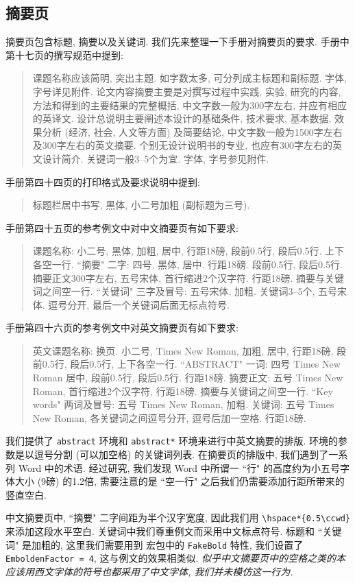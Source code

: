 \subsection{摘要页}

摘要页包含标题, 摘要以及关键词. 我们先来整理一下手册对摘要页的要求. 手册中第十七页的撰写规范中提到:
\begin{quote}
  课题名称应该简明, 突出主题. 如字数太多, 可分列成主标题和副标题. 字体, 字号详见附件.
  论文内容摘要主要是对撰写过程中实践, 实验, 研究的内容, 方法和得到的主要结果的完整概括, 中文字数一般为300字左右, 并应有相应的英译文.
  设计总说明主要阐述本设计的基础条件, 技术要求, 基本数据, 效果分析 (经济, 社会, 人文等方面) 及简要结论, 中文字数一般为1500字左右及300字左右的英文摘要. 个别无设计说明书的专业, 也应有300字左右的英文设计简介.
  关键词一般3--5个为宜. 字体, 字号参见附件.
\end{quote}
手册第四十四页的打印格式及要求说明中提到:
\begin{quote}
  标题栏居中书写, 黑体, 小二号加粗 (副标题为三号).
\end{quote}
手册第四十五页的参考例文中对中文摘要页有如下要求:
\begin{quote}
  课题名称: 小二号, 黑体, 加粗, 居中, 行距18磅, 段前0.5行, 段后0.5行. 上下各空一行.
  ``摘要" 二字: 四号, 黑体, 居中. 行距18磅. 段前0.5行, 段后0.5行.
  摘要正文300字左右, 五号宋体, 首行缩进2个汉字符. 行距18磅.
  摘要与关键词之间空一行.
  ``关键词" 三字及冒号: 五号宋体, 加粗.
  关键词3--5个, 五号宋体. 逗号分开, 最后一个关键词后面无标点符号.
\end{quote}
手册第四十六页的参考例文中对英文摘要页有如下要求:
\begin{quote}
  英文课题名称: 换页. 小二号, Times New Roman, 加粗, 居中, 行距18磅, 段前0.5行, 段后0.5行, 上下各空一行.
  ``ABSTRACT" 一词: 四号 Times New Roman 居中, 段前0.5行, 段后0.5行. 行距18磅.
  摘要正文: 五号 Times New Roman, 首行缩进2个汉字符, 行距18磅.
  摘要与关键词之间空一行.
  ``Key words" 两词及冒号: 五号 Times New Roman, 加粗.
  关键词: 五号 Times New Roman, 各关键词之间逗号分开, 逗号后加一空格. 行距18磅.
\end{quote}

我们提供了 \verb|abstract| 环境和 \verb|abstract*| 环境来进行中英文摘要的排版. 环境的参数是以逗号分割 (可以加空格) 的关键词列表. 在摘要页的排版中, 我们遇到了一系列 Word 中的术语. 经过研究, 我们发现 Word 中所谓一 ``行" 的高度约为小五号字体大小 (9磅) 的1.2倍, 需要注意的是 ``空一行" 之后我们仍需要添加行距所带来的竖直空白.

中文摘要页中, ``摘要" 二字间距为半个汉字宽度, 因此我们用 \verb|\hspace*{0.5\ccwd}| 来添加这段水平空白. 关键词中我们尊重例文而采用中文标点符号. 标题和 ``关键词" 是加粗的, 这里我们需要用到  宏包中的 \verb|FakeBold| 特性, 我们设置了 \verb|EmboldenFactor = 4|, 这与例文的效果相类似. \emph{似乎中文摘要页中的空格之类的本应该用西文字体的符号也都采用了中文字体, 我们并未模仿这一行为.}

